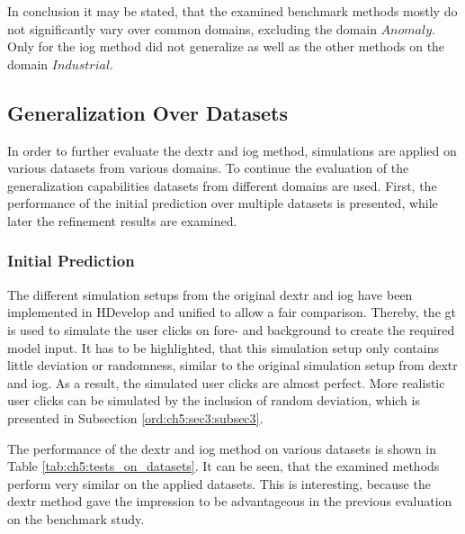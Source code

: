 In conclusion it may be stated, that the examined benchmark methods mostly do not significantly vary over common domains, excluding the domain $ Anomaly $.
Only for the \gls{iog} method did not generalize as well as the other methods on the domain $ Industrial $.


\subsection{Generalization Over Datasets} \label{ord:ch5:sec2:subsec2}

In order to further evaluate the \gls{dextr} and \gls{iog} method, simulations are applied on various datasets from various domains.
To continue the evaluation of the generalization capabilities datasets from different domains are used.
First, the performance of the initial prediction over multiple datasets is presented, while later the refinement results are examined. 

\subsubsection{Initial Prediction}

The different simulation setups from the original \gls{dextr} \cite{Man18-DEXTR} and \gls{iog} \cite{Zha20-IOG} have been implemented in HDevelop and unified to allow a fair comparison. 
Thereby, the \gls{gt} is used to simulate the user clicks on fore- and background to create the required model input.
It has to be highlighted, that this simulation setup only contains little deviation or randomness, similar to the original simulation setup from \gls{dextr} and \gls{iog}.
As a result, the simulated user clicks are almost perfect.
More realistic user clicks can be simulated by the inclusion of random deviation, which is presented in Subsection \ref{ord:ch5:sec3:subsec3}.

The performance of the \gls{dextr} and \gls{iog} method on various datasets is shown in Table \ref{tab:ch5:tests_on_datasets}.
It can be seen, that the examined methods perform very similar on the applied datasets.
This is interesting, because the \gls{dextr} method gave the impression to be advantageous in the previous evaluation on the benchmark study.

